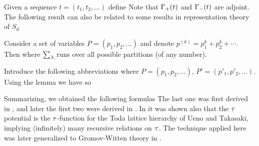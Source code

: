 \documentclass[../main/main.tex]{subfiles}
\begin{document}
Given a sequence $t=(t_1,t_2,\ldots)$ define
Note that $\Gamma_+(t)$ and $\Gamma_-(t)$ are adjoint. The following result can also be related to some results in representation theory of $S_d$
\begin{lemma}[{\cite[Eq. (A.16)]{O2}}]
	Consider a set of variables $P=(p_1,p_2,\ldots)$ and denote $p^{(k)}=p_1^k+p_2^k+\cdots$. Then
	where $\sum_\lambda$ runs over all possible partitions (of any number).
\end{lemma}
Introduce the following abbreviations
where $P=(p_1,p_2,\ldots)$, $P'=(p'_1,p'_2,\ldots)$. 
Using the lemma we have
so

Summarizing, we obtained the following formulas
The last one was first derived in \cite{O1}, and later the first two were derived in \cite{J}. In \cite{O1} it was shown also that the $\tau$ potential is the $\tau$-function for the Toda lattice hierarchy of Ueno and Takasaki, implying (infinitely) many recursive relations on $\tau$. The technique applied here was later generalized to Gromov-Witten theory in \cite{OP1,OP2}. 
\end{document}
